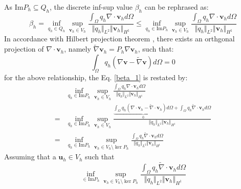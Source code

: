 As $\textrm{Im} P_h \subseteq Q_h$, the discrete inf-sup value $\beta_h$ can be rephrased as:
\begin{equation}\label{beta_1}
\beta_h = \inf_{q_h \in Q_h} \sup_{\boldsymbol v_h \in V_h} \frac{\int_{\Omega} q_h \nabla \cdot \boldsymbol v_h d\Omega}{\Vert q_h \Vert_{L^2} \Vert \boldsymbol v_h \Vert_{H^1}} 
    \le \inf_{q_h \in \textrm{Im} P_h} \sup_{\boldsymbol v_h \in V_h} \frac{\int_{\Omega} q_h \nabla \cdot \boldsymbol v_h d\Omega}{\Vert q_h \Vert_{L^2} \Vert \boldsymbol v_h \Vert_{H^1}} 
\end{equation}
In accordance with Hilbert projection theorem \cite{philippeg.2013}, there exists an orthgonal projection of $\nabla \cdot \boldsymbol v_h$, namely $\tilde \nabla \boldsymbol v_h = P_h \nabla \boldsymbol v_h$, such that: 
\begin{equation}
    \int_\Omega q_h (\nabla \boldsymbol v - \tilde \nabla \boldsymbol v) d\Omega = 0
\end{equation}
for the above relationship, the Eq. \eqref{beta_1} is restated by:
\begin{equation}
\begin{split}
    &\inf_{q_h \in \textrm{Im} P_h} \sup_{\boldsymbol v_h \in V_h} \frac{\int_{\Omega} q_h \nabla \cdot \boldsymbol v_h d\Omega}{\Vert q_h \Vert_{L^2} \Vert \boldsymbol v_h \Vert_{H^1}} \\
    =& \inf_{q_h \in \textrm{Im} P_h} \sup_{\boldsymbol v_h \in V_h} \frac{\underbrace{\int_{\Omega} q_h (\nabla \cdot \boldsymbol v_h - \tilde{\nabla} \cdot \boldsymbol v_h) d\Omega}_{0} + \int_\Omega q_h \tilde{\nabla} \cdot \boldsymbol v_h d\Omega}{\Vert q_h \Vert_{L^2} \Vert \boldsymbol v_h \Vert_{H^1}} \\
    =& \inf_{q_h \in \textrm{Im} P_h} \sup_{\boldsymbol v_h \in V_h\setminus \ker P_h} \frac{\int_\Omega q_h \tilde{\nabla} \cdot \boldsymbol v_h d\Omega}{\Vert q_h \Vert_{L^2} \Vert \boldsymbol v_h \Vert_{H^1}}
\end{split}
\end{equation}
Assuming that a $\boldsymbol u_h \in V_h$ such that 
\begin{equation}
    \inf_{\boldsymbol  \in \textrm{Im} P_h} \sup_{\boldsymbol v_h \in V_h\setminus \ker P_h} \frac{\int_\Omega q_h \tilde{\nabla} \cdot \boldsymbol v_h d\Omega}{\Vert q_h \Vert_{L^2} \Vert \boldsymbol v_h \Vert_{H^1}}
\end{equation}


